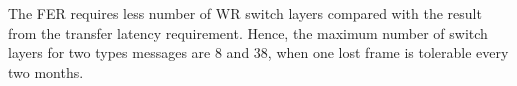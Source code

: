 The FER requires less number of WR switch layers compared with the result from the transfer latency requirement. Hence, the maximum number of switch layers for two types messages are 8 and 38, when one lost frame is tolerable every two months. 


